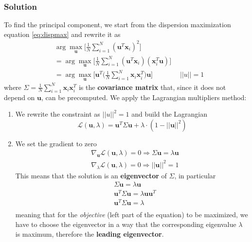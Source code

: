 \subsubsection{Solution}
To find the principal component, we start from the dispersion maximization equation \ref{eq:dispmax} and rewrite it as
\begin{align*}
	& \arg\max_\mathbf{u} \big[\frac{1}{N} \sum_{i=1}^N(\mathbf{u}^T\mathbf{x}_i)^2\big] \\
	& = \arg\max_\mathbf{u} \big[\frac{1}{N} \sum_{i=1}^N (\mathbf{u}^T\mathbf{x}_i)(\mathbf{x}_i^T\mathbf{u})\big]\\
	& = \arg\max_\mathbf{u} \big[\mathbf{u}^T \big(\frac{1}{N} \sum_{i=1}^N\mathbf{x}_i\mathbf{x}_i^T\big)\mathbf{u}\big] \qquad\qquad \lvert\lvert u \rvert\rvert = 1
\end{align*}
where $\Sigma = \frac{1}{N} \sum_{i=1}^N\mathbf{x}_i\mathbf{x}_i^T$ is the \textbf{covariance matrix} that, since it does not depend on $\mathbf{u}$, can be precomputed. We apply the Lagrangian multipliers method:
\begin{enumerate}
	\item We rewrite the constraint as $\lvert\lvert u \rvert\rvert^2 = 1$ and build the Lagrangian
	\begin{equation*}
		\mathcal{L}(\mathbf{u}, \lambda) = \mathbf{u}^T \Sigma\mathbf{u} + \lambda \cdot (1-\lvert\lvert \mathbf{u} \rvert\rvert ^2)
	\end{equation*}
	\item We set the gradient to zero
	\begin{align*}
		& \nabla_\mathbf{u}\mathcal{L}(\mathbf{u}, \lambda)=0 \Rightarrow \Sigma\mathbf{u}=\lambda\mathbf{u} \\
		& \nabla_\lambda\mathcal{L}(\mathbf{u}, \lambda)=0 \Rightarrow \lvert\lvert \mathbf{u}\rvert\rvert^2=1
	\end{align*}
	This means that the solution is an \textbf{eigenvector} of $\Sigma$, in particular
	\begin{align*}
		& \Sigma\mathbf{u}=\lambda\mathbf{u}  \\
		& \mathbf{u}^T\Sigma\mathbf{u}=\lambda\mathbf{u}\mathbf{u}^T \\
		 & \mathbf{u}^T\Sigma\mathbf{u}=\lambda\\
	\end{align*}
	meaning that for the \textit{objective} (left part of the equation) to be maximized, we have to choose the eigenvector in a way that the corresponding eigenvalue $\lambda$ is maximum, therefore the \textbf{leading eigenvector}.
\end{enumerate}
